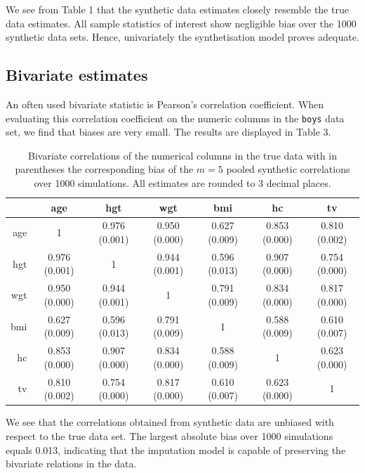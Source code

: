 \documentclass[psych,article,submit,moreauthors,pdftex]{mdpi}
\begin{document}
We see from Table 1 that the synthetic data estimates closely resemble
the true data estimates. All sample statistics of interest show
negligible bias over the 1000 synthetic data sets. Hence, univariately
the synthetisation model proves adequate.

\hypertarget{bivariate-estimates}{%
\subsection{Bivariate estimates}\label{bivariate-estimates}}

An often used bivariate statistic is Pearson's correlation coefficient.
When evaluating this correlation coefficient on the numeric columns in
the \texttt{boys} data set, we find that biases are very small. The
results are displayed in Table 3.

\begin{table}[H]
\caption{Bivariate correlations of the numerical columns in the true data with in parentheses the corresponding bias of the $m=5$ pooled synthetic correlations over 1000 simulations. All estimates are rounded to 3 decimal places. }
\centering
\begin{tabular}{rcccccc}
  \hline
 & age & hgt & wgt & bmi & hc & tv \\ 
  \hline
age & 1 & 0.976 (0.001) & 0.950 (0.000) & 0.627 (0.009) & 0.853 (0.000) & 0.810 (0.002) \\ 
  hgt & 0.976 (0.001) & 1 & 0.944 (0.001) & 0.596 (0.013) & 0.907 (0.000) & 0.754 (0.000) \\ 
  wgt & 0.950 (0.000) & 0.944 (0.001) & 1 & 0.791 (0.009) & 0.834 (0.000) & 0.817 (0.000) \\ 
  bmi & 0.627 (0.009) & 0.596 (0.013) & 0.791 (0.009) & 1 & 0.588 (0.009) & 0.610 (0.007) \\ 
  hc & 0.853 (0.000) & 0.907 (0.000) & 0.834 (0.000) & 0.588 (0.009) & 1 & 0.623 (0.000) \\ 
  tv & 0.810 (0.002) & 0.754 (0.000) & 0.817 (0.000) & 0.610 (0.007) & 0.623 (0.000) & 1 \\ 
   \hline
\end{tabular}
\end{table}

We see that the correlations obtained from synthetic data are unbiased
with respect to the true data set. The largest absolute bias over 1000
simulations equals 0.013, indicating that the imputation model is
capable of preserving the bivariate relations in the data.
\end{document}
